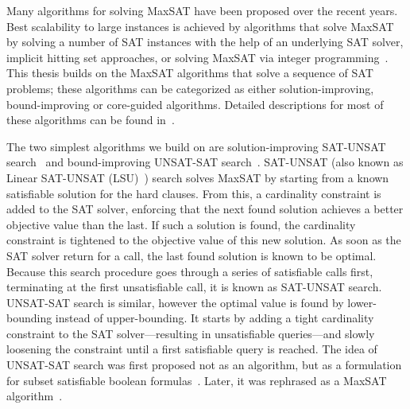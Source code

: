 Many algorithms for solving MaxSAT have been proposed over the recent years.
Best scalability to large instances is achieved by algorithms that solve MaxSAT by solving a number of SAT instances with the help of an underlying SAT solver, implicit hitting set approaches, or solving MaxSAT via integer programming~\autocite{handbook2-maxsat}.
This thesis builds on the MaxSAT algorithms that solve a sequence of SAT problems;
these algorithms can be categorized as either solution-improving, bound-improving or core-guided algorithms.
Detailed descriptions for most of these algorithms can be found in~\autocite{handbook2-maxsat}.

The two simplest algorithms we build on are solution-improving SAT-UNSAT search~\autocite{DBLP:journals/jsat/BerreP10} and bound-improving UNSAT-SAT search~\autocite{DBLP:conf/sat/FuM06}.
SAT-UNSAT (also known as Linear SAT-UNSAT (LSU)~\autocite{handbook2-maxsat}) search solves MaxSAT by starting from a known satisfiable solution for the hard clauses.
From this, a cardinality constraint is added to the SAT solver, enforcing that the next found solution achieves a better objective value than the last.
If such a solution is found, the cardinality constraint is tightened to the objective value of this new solution.
As soon as the SAT solver return \unsat{} for a call, the last found solution is known to be optimal.
Because this search procedure goes through a series of satisfiable calls first, terminating at the first unsatisfiable call, it is known as SAT-UNSAT search.
UNSAT-SAT search is similar, however the optimal value is found by lower-bounding instead of upper-bounding.
It starts by adding a tight cardinality constraint to the SAT solver---resulting in unsatisfiable queries---and slowly loosening the constraint until a first satisfiable query is reached.
The idea of UNSAT-SAT search was first proposed not as an algorithm, but as a formulation for subset satisfiable boolean formulas~\autocite{DBLP:journals/tcad/XuRS03}.
Later, it was rephrased as a MaxSAT algorithm~\autocite{DBLP:conf/sat/FuM06}.

